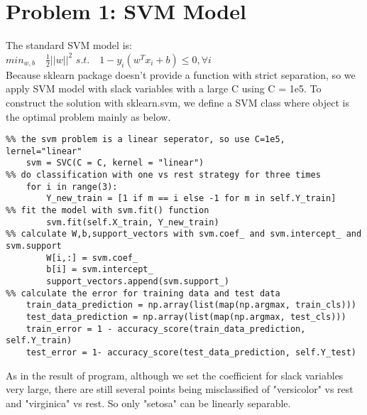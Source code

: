 \documentclass{article}
\begin{document}
{{\section*{Problem 1: SVM Model}
The standard SVM model is:\\ $min_{w,b}\quad \frac{1}{2}||w||^2$ \newline \hspace{60pt}$s.t. \quad 1-y_i(w^Tx_i+b)\leq 0, \forall i $\\
Because sklearn package doesn't provide a function with strict separation, so we apply SVM model with slack variables with a large C using C = 1e5.
To construct the solution with sklearn.svm, we define a SVM class where object is the optimal problem mainly as below. 
\begin{lstlisting}
%% the svm problem is a linear seperator, so use C=1e5, lernel="linear"
    svm = SVC(C = C, kernel = "linear")
%% do classification with one vs rest strategy for three times
    for i in range(3):
        Y_new_train = [1 if m == i else -1 for m in self.Y_train]
%% fit the model with svm.fit() function
        svm.fit(self.X_train, Y_new_train)
%% calculate W,b,support_vectors with svm.coef_ and svm.intercept_ and svm.support
        W[i,:] = svm.coef_
        b[i] = svm.intercept_
        support_vectors.append(svm.support_)
%% calculate the error for training data and test data
    train_data_prediction = np.array(list(map(np.argmax, train_cls)))
    test_data_prediction = np.array(list(map(np.argmax, test_cls)))
    train_error = 1 - accuracy_score(train_data_prediction, self.Y_train)
    test_error = 1- accuracy_score(test_data_prediction, self.Y_test)
\end{lstlisting}
As in the result of program, although we set the coefficient for slack variables very large, there are still several points being misclassified of "versicolor" vs rest and "virginica" vs rest. 
So only "setosa" can be linearly separable. \newline
~\\

}}
\end{document}
